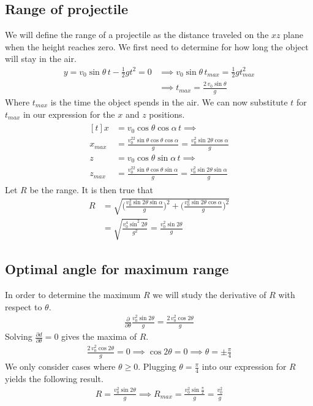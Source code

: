 \documentclass[%
aip,
jmp,
amsmath,amssymb,
reprint,%
]{revtex4-1}
\begin{document}
	\subsection{Range of projectile}
	We will define the range of a projectile as the distance traveled on the $xz$ plane when the height reaches zero. We first need to determine for how long the object will stay in the air.
	\begin{align}\nonumber
		y = v_0 \sin\theta\,t - \frac12gt^2 = 0&\implies v_0 \sin\theta\,t_{max} = \frac12gt_{max}^2\\\label{eq:tMax}
		&\implies t_{max} = \frac{2\,v_0 \sin\theta}{g}
	\end{align}
	Where $t_{max}$ is the time the object spends in the air. We can now substitute $t$ for $t_{max}$ in our expression for the $x$ and $z$ positions.
	\begin{align}\nonumber
		\begin{aligned}[t]
			x &= v_0 \cos\theta\cos\alpha\,t \implies  \\\nonumber
			x_{max} &= \frac{v_0^22\sin\theta\cos\theta\cos\alpha}{g} = \frac{v_0^2 \sin2\theta\cos\alpha}{g}\\\nonumber
			z &= v_0 \cos\theta\sin\alpha\,t \implies\\\nonumber
			z_{max} &= \frac{v_0^22\sin\theta\cos\theta\sin\alpha}{g} = \frac{v_0^2 \sin2\theta\sin\alpha}{g}\nonumber
		\end{aligned}
	\end{align}
	Let $R$ be the range. It is then true that
	\begin{align}\nonumber
		R &= \sqrt{\Big(\frac{v_{0}^2\sin2\theta\sin\alpha}{g}\Big)^2 + \Big(\frac{v_{0}^2\sin2\theta\cos\alpha}{g}\Big)^2}\\\label{eq:distance}
		&=\sqrt{\frac{v_{0}^4\sin^2 2\theta}{g^2}} = \frac{v_{0}^2\sin2\theta}{g}
	\end{align}
	\subsection{Optimal angle for maximum range}
	In order to determine the maximum $R$ we will study the derivative of $R$ with respect to $\theta$.
	\begin{align}\nonumber
		\frac{\partial}{\partial\theta} \frac{v_0^2\sin2\theta}{g} = \frac{2\,v_0^2\cos2\theta}{g}
	\end{align}
	Solving $\frac{\partial d}{\partial \theta} = 0$ gives the maxima of $R$.
	\begin{align}\nonumber
		\frac{2\,v_0^2\cos2\theta}{g} = 0 \implies \cos2\theta = 0 \implies \theta = \pm\frac{\pi}{4}
	\end{align}
	We only consider cases where $\theta \geq 0$. Plugging $\theta=\frac{\pi}{4}$ into our expression for $R$ yields the following result.
	\begin{align}\nonumber
		R = \frac{v_{0}^2\sin2\theta}{g} \implies R_{max} = \frac{v_{0}^2\sin\frac\pi2}{g} = \frac{v_{0}^2}{g}
	\end{align}
\end{document}
